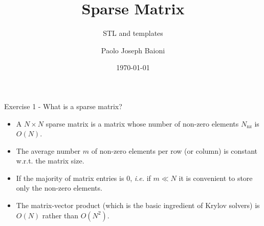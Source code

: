 \documentclass[10pt]{beamer}
\begin{document}
    \title{Sparse Matrix}
    \subtitle{STL and templates}
    \author{Paolo Joseph Baioni}
    \date{\today}

\begin{frame}
    \maketitle
\end{frame}


\begin{frame}{Exercise 1 - What is a sparse matrix?}
\begin{itemize}
\item A $N \times N$ sparse matrix is a matrix whose number of non-zero elements $N_\mathrm{nz}$ is $O(N)$. \\[3mm]
\item The average number $m$ of non-zero elements per row (or column)
is constant w.r.t. the matrix size. \\[3mm]
\item If the majority of matrix entries is $0$, {\it i.e.} if $m \ll N$ it is convenient to store only the non-zero elements.\\[3mm]
\item The matrix-vector product (which is the basic ingredient of Krylov solvers) is $O(N)$ rather than $O(N^{2})$.\\[3mm]
\end{itemize}
\end{frame}
\end{document}
